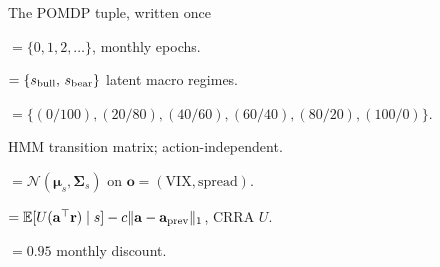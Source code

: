 \documentclass[11pt,aspectratio=169]{beamer}
\newcommand{\E}{\mathbb{E}}
\newcommand{\state}{\mathcal{S}}
\renewcommand{\action}{\mathcal{A}}
\begin{document}
\begin{frame}{The POMDP tuple, written once}
\footnotesize
\begin{description}[itemsep=3pt,topsep=0pt,leftmargin=2cm]
  \item[$\mathcal{T}$] $=\{0,1,2,\dots\}$, monthly epochs.
  \item[$\state$] $=\{s_{\rm bull},\, s_{\rm bear}\}$ latent macro regimes.
  \item[$\action$] $=\{(0/100),(20/80),(40/60),(60/40),(80/20),(100/0)\}$.
  \item[$T(s'\mid s)$] HMM transition matrix; \alert{action-independent}.
  \item[$O(\mathbf{o}\mid s)$] $=\mathcal{N}(\boldsymbol\mu_s,\boldsymbol\Sigma_s)$ on $\mathbf{o}=(\mathrm{VIX},\mathrm{spread})$.
  \item[$R(s,\mathbf{a})$] $=\E[U(\mathbf{a}^\top\mathbf{r})\mid s]-c\lVert\mathbf{a}-\mathbf{a}_{\rm prev}\rVert_1$, CRRA $U$.
  \item[$\lambda$] $=0.95$ monthly discount.
\end{description}
\end{frame}
\end{document}
